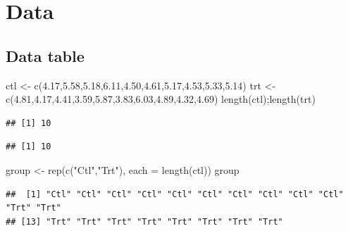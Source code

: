 \documentclass[
]{book}
\newenvironment{Shaded}{\begin{snugshade}}{\end{snugshade}}
\newcommand{\AttributeTok}[1]{\textcolor[rgb]{0.77,0.63,0.00}{#1}}
\newcommand{\FloatTok}[1]{\textcolor[rgb]{0.00,0.00,0.81}{#1}}
\newcommand{\FunctionTok}[1]{\textcolor[rgb]{0.00,0.00,0.00}{#1}}
\newcommand{\NormalTok}[1]{#1}
\newcommand{\OtherTok}[1]{\textcolor[rgb]{0.56,0.35,0.01}{#1}}
\newcommand{\StringTok}[1]{\textcolor[rgb]{0.31,0.60,0.02}{#1}}
\begin{document}
\hypertarget{data}{%
\section{Data}\label{data}}

\hypertarget{data-table}{%
\subsection{Data table}\label{data-table}}

\begin{Shaded}
\begin{Highlighting}[]
\NormalTok{ctl }\OtherTok{\textless{}{-}} \FunctionTok{c}\NormalTok{(}\FloatTok{4.17}\NormalTok{,}\FloatTok{5.58}\NormalTok{,}\FloatTok{5.18}\NormalTok{,}\FloatTok{6.11}\NormalTok{,}\FloatTok{4.50}\NormalTok{,}\FloatTok{4.61}\NormalTok{,}\FloatTok{5.17}\NormalTok{,}\FloatTok{4.53}\NormalTok{,}\FloatTok{5.33}\NormalTok{,}\FloatTok{5.14}\NormalTok{)}
\NormalTok{trt }\OtherTok{\textless{}{-}} \FunctionTok{c}\NormalTok{(}\FloatTok{4.81}\NormalTok{,}\FloatTok{4.17}\NormalTok{,}\FloatTok{4.41}\NormalTok{,}\FloatTok{3.59}\NormalTok{,}\FloatTok{5.87}\NormalTok{,}\FloatTok{3.83}\NormalTok{,}\FloatTok{6.03}\NormalTok{,}\FloatTok{4.89}\NormalTok{,}\FloatTok{4.32}\NormalTok{,}\FloatTok{4.69}\NormalTok{)}
\FunctionTok{length}\NormalTok{(ctl);}\FunctionTok{length}\NormalTok{(trt)}
\end{Highlighting}
\end{Shaded}

\begin{verbatim}
## [1] 10
\end{verbatim}

\begin{verbatim}
## [1] 10
\end{verbatim}

\begin{Shaded}
\begin{Highlighting}[]
\NormalTok{group }\OtherTok{\textless{}{-}} \FunctionTok{rep}\NormalTok{(}\FunctionTok{c}\NormalTok{(}\StringTok{"Ctl"}\NormalTok{,}\StringTok{"Trt"}\NormalTok{), }\AttributeTok{each =} \FunctionTok{length}\NormalTok{(ctl))}
\NormalTok{group}
\end{Highlighting}
\end{Shaded}

\begin{verbatim}
##  [1] "Ctl" "Ctl" "Ctl" "Ctl" "Ctl" "Ctl" "Ctl" "Ctl" "Ctl" "Ctl" "Trt" "Trt"
## [13] "Trt" "Trt" "Trt" "Trt" "Trt" "Trt" "Trt" "Trt"
\end{verbatim}
\end{document}
